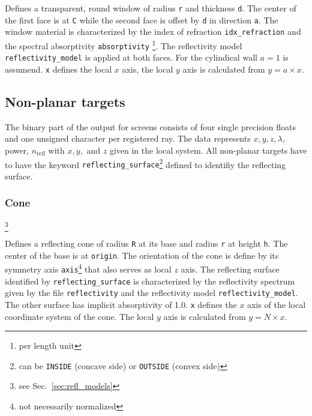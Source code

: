 \documentclass[10pt,a4paper,titlepage]{article}
\begin{document}
\vspace{0.25cm}
Defines a transparent, round window of radius {\tt r} and thickness {\tt d}. The center of the first face is at {\tt C} while the second face is offset by {\tt d} in direction {\tt a}. The window material is characterized by the index of refraction {\tt idx\_refraction} and the spectral absorptivity {\tt absorptivity} \footnote{per length unit}. The reflectivity model {\tt reflectivity\_model} is applied at both faces. For the cylindical wall $a=1$ is assumend. {\tt x} defines the local $x$ axis, the local $y$ axis is calculated from $y = a \times x$.



\subsection{Non-planar targets}

The binary part of the output for screens consists of four single precision floats and one unsigned character per registered ray. The data represents $x, y, z, \lambda$, power,  $n_{\mathrm{refl}}$ with $x, y,$ and $z$ given in the local system. All non-planar targets have to have the keyword {\tt reflecting\_surface}\footnote{can be {\tt INSIDE} (concave side) or {\tt OUTSIDE} (convex side)} defined to identifiy the reflecting surface.

\subsubsection{Cone}









\footnote{see Sec.~\ref{sec:refl_models}}


\vspace{0.25cm}
Defines a reflecting cone of radius {\tt R} at its base and radius {\tt r} at height {\tt h}. The center of the base is at {\tt origin}. The orientation of the cone is define by its symmetry axis {\tt axis}\footnote{not necessarily normalized} that also serves as local $z$ axis. The reflecting surface identified by {\tt reflecting\_surface} is characterized by the reflectivity spectrum given by the file {\tt reflectivity} and the reflectivity model {\tt reflectivity\_model}. The other surface has implicit absorptivity of 1.0. {\tt x} defines the $x$ axis of the local coordinate system of the cone. The local $y$ axis is calculated from $y = N \times x$.
\end{document}
